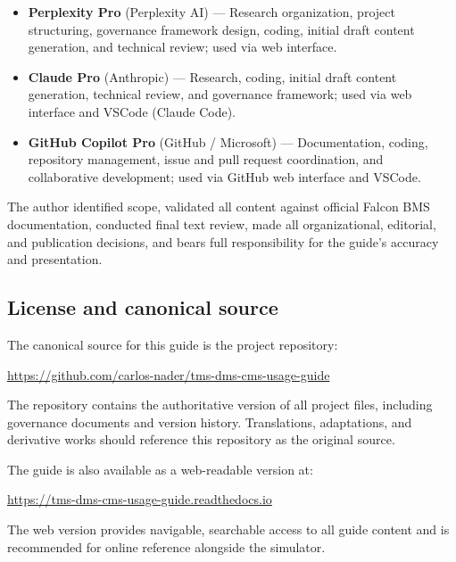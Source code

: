 \documentclass[11pt, a4paper, twoside]{report}
\begin{document}
\begin{itemize}
	\item \textbf{Perplexity Pro} (Perplexity AI) --- Research organization, project structuring, governance framework design, coding, initial draft content generation, and technical review; used via web interface.
	\item \textbf{Claude Pro} (Anthropic) --- Research, coding, initial draft content generation, technical review, and governance framework; used via web interface and VSCode (Claude Code).
	\item \textbf{GitHub Copilot Pro} (GitHub / Microsoft) --- Documentation, coding, repository management, issue and pull request coordination, and collaborative development; used via GitHub web interface and VSCode.
\end{itemize}

The author identified scope, validated all content against official Falcon BMS documentation, conducted final text review, made all organizational, editorial, and publication decisions, and bears full responsibility for the guide's accuracy and presentation.

\subsection{License and canonical source}
\label{sec:C1-S4-S3}

The canonical source for this guide is the project repository:

\begin{center}
	\url{https://github.com/carlos-nader/tms-dms-cms-usage-guide}
\end{center}

The repository contains the authoritative version of all project files, including governance documents and version history. Translations, adaptations, and derivative works should reference this repository as the original source.

The guide is also available as a web-readable version at:

\begin{center}
	\url{https://tms-dms-cms-usage-guide.readthedocs.io}
\end{center}

The web version provides navigable, searchable access to all guide content and is recommended for online reference alongside the simulator.
\end{document}
